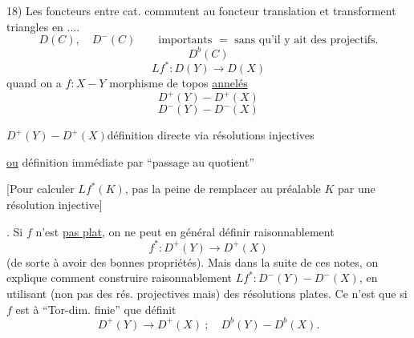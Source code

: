 18) Les foncteurs entre cat.   commutent au foncteur translation et transforment triangles  en  ....
\[
D(C),\quad D^-(C)\qquad\text{importants }=\text{ sans qu'il y ait des projectifs.}
\]
\[
D^b(C)
\]
\[
Lf^*:D(Y)\longrightarrow D(X)
\]
quand on a $f:X\mathbin{-}Y$ morphisme  de topos \uline{annelés}
\[
D^+(Y)\mathbin{-}D^+(X)
\]
\[
D^-(Y)\mathbin{-}D^-(X)
\]

$D^+(Y)\mathbin{-}D^+(X)$\qquad définition directe via résolutions injectives

\uline{ou} définition immédiate par ``passage au quotient''

[Pour calculer $Lf^*(K)$, pas la peine de remplacer au préalable $K$ par une résolution injective]

. Si $f$ n'est \uline{pas plat}, on  ne peut en général définir raisonnablement
\[
f^*:D^+(Y)\longrightarrow D^+(X)
\]
(de sorte à avoir des bonnes propriétés). Mais dans la suite de ces notes, on explique comment construire raisonnablement $Lf^*:D^-(Y)\mathbin{-}D^-(X)$,  en utilisant (non pas des rés. projectives mais) des résolutions plates. Ce n'est que si $f$ est à ``Tor-dim. finie'' que  définit
\[
D^+(Y)\longrightarrow D^+(X)\ ;\quad D^b(Y)\mathbin{-}D^b(X).
\]
